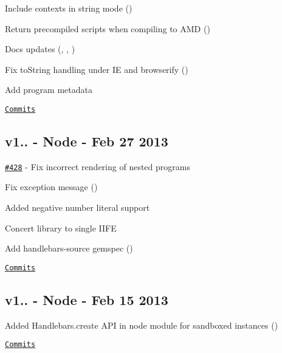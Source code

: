\begin{DoxyItemize}
\item Include contexts in string mode (\href{https://github.com/leshill}{\tt })
\item Return precompiled scripts when compiling to A\+MD (\href{https://github.com/JamesMaroney}{\tt })
\item Docs updates (\href{https://github.com/iangreenleaf}{\tt }, \href{https://github.com/gilesbowkett}{\tt }, \href{https://github.com/utkarsh2012}{\tt })
\item Fix {\ttfamily to\+String} handling under IE and browserify (\href{https://github.com/tommydudebreaux}{\tt })
\item Add program metadata
\end{DoxyItemize}

\href{https://github.com/wycats/handlebars.js/compare/v1.0.10...v1.0.11}{\tt Commits}

\subsection*{v1.. -\/ Node -\/ Feb 27 2013}


\begin{DoxyItemize}
\item \href{https://github.com/wycats/handlebars.js/issues/428}{\tt \#428} -\/ Fix incorrect rendering of nested programs
\item Fix exception message (\href{https://github.com/tricknotes}{\tt })
\item Added negative number literal support
\item Concert library to single I\+I\+FE
\item Add handlebars-\/source gemspec (\href{https://github.com/machty}{\tt })
\end{DoxyItemize}

\href{https://github.com/wycats/handlebars.js/compare/v1.0.9...v1.0.10}{\tt Commits}

\subsection*{v1.. -\/ Node -\/ Feb 15 2013}


\begin{DoxyItemize}
\item Added {\ttfamily Handlebars.\+create} A\+PI in node module for sandboxed instances (\href{https://github.com/tommydudebreaux}{\tt })
\end{DoxyItemize}

\href{https://github.com/wycats/handlebars.js/compare/1.0.0-rc.3...v1.0.9}{\tt Commits}

